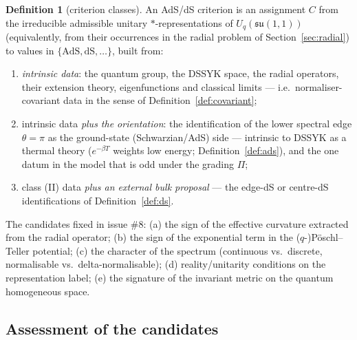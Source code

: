 \documentclass[11pt,a4paper]{article}
\theoremstyle{definition}
\newtheorem{definition}{Definition}[section]
\theoremstyle{plain}
\newcommand{\Uq}{U_q(\mathfrak{su}(1,1))}
\begin{document}
\begin{definition}[criterion classes]\label{def:criterionclasses}
An AdS/dS criterion is an assignment $C$ from the irreducible admissible unitary
$*$-representations of $\Uq$ (equivalently, from their occurrences in the radial problem of
Section~\ref{sec:radial}) to values in $\{\mathrm{AdS},\mathrm{dS},\ldots\}$, built from:
\begin{enumerate}[label=(\Roman*)]
\item \emph{intrinsic data}: the quantum group, the DSSYK space, the radial operators, their
extension theory, eigenfunctions and classical limits --- i.e.\ normaliser-covariant data in
the sense of Definition~\ref{def:covariant};
\item intrinsic data \emph{plus the orientation}: the identification of the lower spectral
edge $\theta=\pi$ as the ground-state (Schwarzian/AdS) side --- intrinsic to DSSYK as a
thermal theory ($e^{-\beta T}$ weights low energy; Definition~\ref{def:ads}), and the one
datum in the model that is odd under the grading $\Pi$;
\item class (II) data \emph{plus an external bulk proposal} --- the edge-dS or centre-dS
identifications of Definition~\ref{def:ds}.
\end{enumerate}
The candidates fixed in issue \#8: (a) the sign of the effective curvature extracted from the
radial operator; (b) the sign of the exponential term in the ($q$-)P\"oschl--Teller
potential; (c) the character of the spectrum (continuous vs.\ discrete, normalisable vs.\
delta-normalisable); (d) reality/unitarity conditions on the representation label; (e) the
signature of the invariant metric on the quantum homogeneous space.
\end{definition}

\subsection{Assessment of the candidates}
\end{document}
